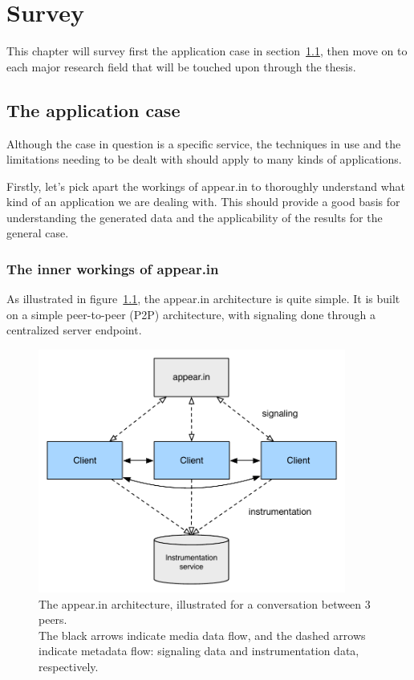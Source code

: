 \chapter{Survey}

\label{Chapter2}


This chapter will survey first the application case in section~\ref{survey:application_case}, then move on to each major research field that will be touched upon through the thesis.

\section{The application case} %
\label{survey:application_case}

Although the case in question is a specific service, the techniques in use and the limitations needing to be dealt with should apply to many kinds of applications.

Firstly, let's pick apart the workings of appear.in to thoroughly understand what kind of an application we are dealing with. This should provide a good basis for understanding the generated data and the applicability of the results for the general case.

\subsection{The inner workings of appear.in}
\label{survey:sub:appearin}

As illustrated in figure~\ref{fig:appearin-arch}, the appear.in architecture is quite simple. It is built on a simple peer-to-peer (P2P) architecture, with signaling done through a centralized server endpoint.

\begin{figure}[h]
  \centering
    \includegraphics[width=0.9\textwidth]{Figures/appearin-arch}
    \caption{The appear.in architecture, illustrated for a conversation between 3 peers. \\ The black arrows indicate media data flow, and the dashed arrows indicate metadata flow: signaling data and instrumentation data, respectively.}
    \label{fig:appearin-arch}
\end{figure}


